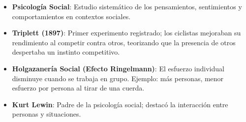 \documentclass[
]{website}
\begin{document}
\begin{itemize}
\item
  \textbf{Psicología Social}: Estudio sistemático de los pensamientos, sentimientos y comportamientos en contextos sociales.
\item
  \textbf{Triplett (1897)}: Primer experimento registrado; los ciclistas mejoraban su rendimiento al competir contra otros, teorizando que la presencia de otros despertaba un instinto competitivo.
\item
  \textbf{Holgazanería Social (Efecto Ringelmann)}: El esfuerzo individual disminuye cuando se trabaja en grupo. Ejemplo: más personas, menor esfuerzo por persona al tirar de una cuerda.
\item
  \textbf{Kurt Lewin}: Padre de la psicología social; destacó la interacción entre personas y situaciones.
\end{itemize}


\end{document}
